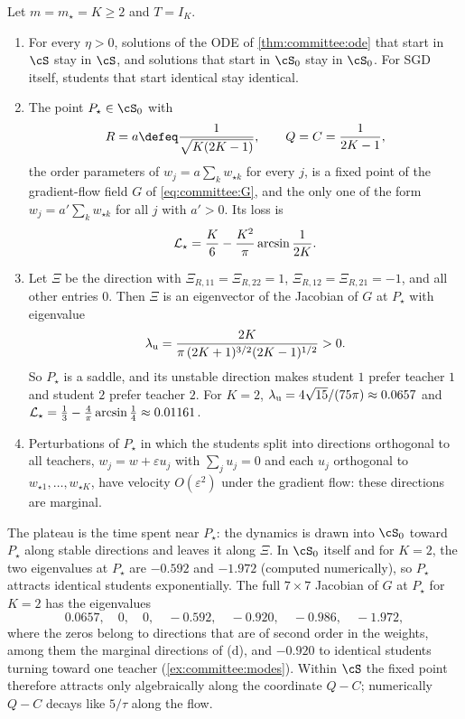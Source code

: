 \begin{refsection}
\begin{theorem}\label{thm:committee:plateau}
Let $m=m_\star=K\ge2$ and $T=I_K$.
\begin{enumerate}
\item[\textup{(a)}] For every $\eta>0$, solutions of the ODE of \cref{thm:committee:ode} that start in $\cS$ stay in $\cS$, and solutions that start in $\cS_0$ stay in $\cS_0$. For SGD itself, students that start identical stay identical.
\item[\textup{(b)}] The point $P_\star\in\cS_0$ with
\[
  R=a\defeq\frac{1}{\sqrt{K(2K-1)}},\qquad Q=C=\frac1{2K-1},
\]
the order parameters of $w_j=a\sum_kw_{\star k}$ for every $j$, is a fixed point of the gradient-flow field $G$ of \eqref{eq:committee:G}, and the only one of the form $w_j=a'\sum_kw_{\star k}$ for all $j$ with $a'>0$. Its loss is
\[
  \mathcal{L}_\star=\frac K6-\frac{K^2}\pi\arcsin\frac1{2K}.
\]
\item[\textup{(c)}] Let $\Xi$ be the direction with $\Xi_{R,11}=\Xi_{R,22}=1$, $\Xi_{R,12}=\Xi_{R,21}=-1$, and all other entries $0$. Then $\Xi$ is an eigenvector of the Jacobian of $G$ at $P_\star$ with eigenvalue
\[
  \lambda_{\mathrm u}=\frac{2K}{\pi\,(2K+1)^{3/2}(2K-1)^{1/2}}>0 .
\]
So $P_\star$ is a saddle, and its unstable direction makes student $1$ prefer teacher $1$ and student $2$ prefer teacher $2$. For $K=2$, $\lambda_{\mathrm u}=4\sqrt{15}/(75\pi)\approx0.0657$ and $\mathcal{L}_\star=\frac13-\frac4\pi\arcsin\frac14\approx0.01161$.
\item[\textup{(d)}] Perturbations of $P_\star$ in which the students split into directions orthogonal to all teachers, $w_j=w+\varepsilon u_j$ with $\sum_ju_j=0$ and each $u_j$ orthogonal to $w_{\star1},\dots,w_{\star K}$, have velocity $O(\varepsilon^2)$ under the gradient flow: these directions are marginal.
\end{enumerate}
\end{theorem}

The plateau is the time spent near $P_\star$: the dynamics is drawn into $\cS_0$ toward $P_\star$ along stable directions and leaves it along $\Xi$. In $\cS_0$ itself and for $K=2$, the two eigenvalues at $P_\star$ are $-0.592$ and $-1.972$ (computed numerically), so $P_\star$ attracts identical students exponentially. The full $7\times7$ Jacobian of $G$ at $P_\star$ for $K=2$ has the eigenvalues
\[
  0.0657,\quad0,\quad0,\quad-0.592,\quad-0.920,\quad-0.986,\quad-1.972,
\]
where the zeros belong to directions that are of second order in the weights, among them the marginal directions of (d), and $-0.920$ to identical students turning toward one teacher (\cref{ex:committee:modes}). Within $\cS$ the fixed point therefore attracts only algebraically along the coordinate $Q-C$; numerically $Q-C$ decays like $5/\tau$ along the flow.


\end{refsection}
